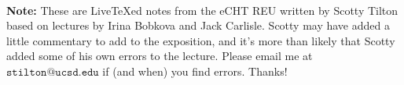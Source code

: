 \documentclass{book}
\begin{document}
    \maketitle

    ~
    \vspace{3in}
    \begin{center}
        \noindent \textbf{Note:} These are Live\TeX ed notes from the eCHT REU written by Scotty Tilton based on lectures by Irina Bobkova and Jack Carlisle. Scotty may have added a little commentary to add to the exposition, and it's more than likely that Scotty added some of his own errors to the lecture. Please email me at $\texttt{stilton@ucsd.edu}$ if (and when) you find errors. Thanks!
    \end{center}
    \tableofcontents
    
    
    

    \newpage
    
    \newpage
    \newpage
    
    
    \printindex
\end{document}
